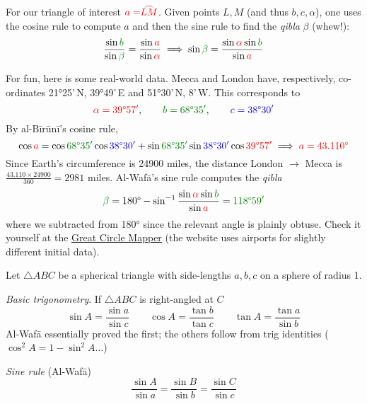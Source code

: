 For our triangle of interest $\textcolor{red}{a=\arc{LM}}$. Given points $L,M$ (and thus $b,c,\alpha$), one uses the cosine rule to compute $a$ and then the sine rule to find the \emph{qibla} $\beta$ (whew!):
\[
	\frac{\sin \textcolor{Green}{b}}{\sin\textcolor{Green}{\beta}}
	=\frac{\sin \textcolor{red}{a}}{\sin\textcolor{red}{\alpha}} 
	\implies \sin\textcolor{Green}{\beta}
	=\frac{\sin\textcolor{red}{\alpha}\sin\textcolor{Green}{b}}{\sin \textcolor{red}{a}}
\]
\vspace{0pt}

\begin{example*}{}{}
	For fun, here is some real-world data. Mecca and London have, respectively, co-ordinates \ang{21}25'\,N, \ang{39}49'\,E and \ang{51}30'\,N, 8'\,W. This corresponds to
	\[
		\textcolor{red}{\alpha=\ang{39}57'},\qquad \textcolor{Green}{b=\ang{68}35'},\qquad \textcolor{blue}{c=\ang{38}30'}
	\]
	By al-Bīrūnī's cosine rule,
	\[
		\cos\textcolor{red}{a} =\cos \textcolor{Green}{\ang{68}35'}\cos \textcolor{blue}{\ang{38}30'}+\sin \textcolor{Green}{\ang{68}35'}\sin\textcolor{blue}{\ang{38}30'}\cos \textcolor{red}{\ang{39}57'} \implies \textcolor{red}{a=\ang{43.110}}
	\]
	Since Earth's circumference is 24900 miles, the distance London $\to$ Mecca is $\frac{43.110\times 24900}{360}=2981$ miles. Al-Wafā's sine rule computes the \emph{qibla}
	\[
		\textcolor{Green}{\beta}=\ang{180} -\sin^{-1}\frac{\sin\textcolor{red}{\alpha}\sin\textcolor{Green}{b}}{\sin \textcolor{red}{a}}=\textcolor{Green}{\ang{118}59'}
	\]
	where we subtracted from \ang{180} since the relevant angle is plainly obtuse. Check it yourself at the \href{http://www.gcmap.com/mapui?P=LON-QCA}{Great Circle Mapper} (the website uses airports for slightly different initial data).
\end{example*}


\goodbreak



Let $\triangle ABC$ be a spherical triangle with side-lengths $a,b,c$ on a sphere of radius 1.\medbreak

\emph{Basic trigonometry}. If $\triangle ABC$ is right-angled at $C$
\[
	\sin A=\frac{\sin a}{\sin c}\qquad \cos A=\frac{\tan b}{\tan c}\qquad \tan A=\frac{\tan a}{\sin b}
\]
Al-Wafā essentially proved the first; the others follow from trig identities ($\cos^2A=1-\sin^2A\ldots$)\medbreak

\emph{Sine rule} (Al-Wafā)
\[
	\frac{\sin A}{\sin a}=\frac{\sin B}{\sin b}=\frac{\sin C}{\sin c}
\]

